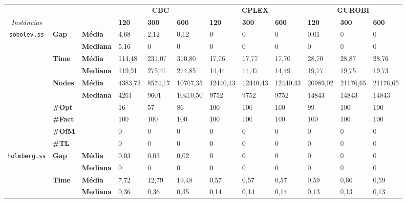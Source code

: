 
	\begin{footnotesize}	
	\caption{}
	\label{cflp:tab:2}
	\begin{tabular}{c@{\hskip 0.2cm}l@{\hskip 0.1cm}l|lll|lll|lll}
	& & & \multicolumn{3}{c}{\textbf{CBC}} & \multicolumn{3}{c}{\textbf{CPLEX}} & \multicolumn{3}{c}{\textbf{GUROBI}} 	\\\textit{Instâncias} & & & \textbf{120} & \textbf{300} & \textbf{600} & \textbf{120} & \textbf{300} & \textbf{600} & \textbf{120} & \textbf{300} & \textbf{600} \\
\hline
\multirow{7}{*}{\texttt{sobolev.ss}} & \multirow{2}{*}{\textbf{Gap}} & \textbf{Média} & 4,68 & 2,12 & 0,12 & 0 & 0 & 0 & 0,01 & 0 & 0 \\
 & & \textbf{Mediana} & 5,16 & 0 & 0 & 0 & 0 & 0 & 0 & 0 & 0 \\
\cline{2-12}
 & \multirow{2}{*}{\textbf{Time}} & \textbf{Média} & 114,48 & 231,07 & 310,80 & 17,76 & 17,77 & 17,70 & 28,70 & 28,87 & 28,76 \\
 & & \textbf{Mediana} & 119,91 & 275,41 & 274,85 & 14,44 & 14,47 & 14,49 & 19,77 & 19,75 & 19,73 \\
\cline{2-12}
 & \multirow{2}{*}{\textbf{Nodes}} & \textbf{Média} & 4383,73 & 8574,17 & 10707,35 & 12440,43 & 12440,43 & 12440,43 & 20989,02 & 21176,65 & 21176,65 \\
 & & \textbf{Mediana} & 4261 & 9601 & 10410,50 & 9752 & 9752 & 9752 & 14843 & 14843 & 14843 \\
\cline{2-12}
 & \textbf{\#Opt} & & 16 & 57 & 86 & 100 & 100 & 100 & 99 & 100 & 100 \\
 & \textbf{\#Fact} & & 100 & 100 & 100 & 100 & 100 & 100 & 100 & 100 & 100 \\
 & \textbf{\#OfM} & & 0 & 0 & 0 & 0 & 0 & 0 & 0 & 0 & 0 \\
 & \textbf{\#TL} & & 0 & 0 & 0 & 0 & 0 & 0 & 0 & 0 & 0 \\
\hline
\multirow{7}{*}{\texttt{holmberg.ss}} & \multirow{2}{*}{\textbf{Gap}} & \textbf{Média} & 0,03 & 0,03 & 0,02 & 0 & 0 & 0 & 0 & 0 & 0 \\
 & & \textbf{Mediana} & 0 & 0 & 0 & 0 & 0 & 0 & 0 & 0 & 0 \\
\cline{2-12}
 & \multirow{2}{*}{\textbf{Time}} & \textbf{Média} & 7,72 & 12,79 & 19,48 & 0,57 & 0,57 & 0,57 & 0,59 & 0,60 & 0,59 \\
 & & \textbf{Mediana} & 0,36 & 0,36 & 0,35 & 0,14 & 0,14 & 0,14 & 0,13 & 0,13 & 0,13 \\

\end{tabular}
\end{footnotesize}
